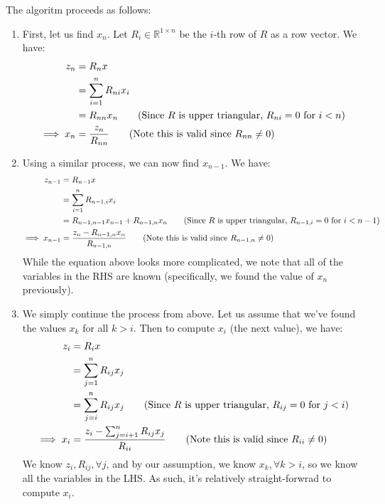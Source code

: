 \documentclass[12pt]{exam}
\begin{document}
\begin{questions}
\begin{solution}
    The algoritm proceeds as follows:
    \begin{enumerate}
      \item First, let us find $x_n$. Let $R_i \in \mathbb{R}^{1 \times n}$ be the $i$-th row of $R$ as a row vector. We have:
        \begin{align*}
          z_n &= R_n x \\
          &= \sum_{i=1}^n R_{ni} x_i \\
          &= R_{nn} x_n \tag{Since $R$ is upper triangular, $R_{ni} = 0$ for $i < n$} \\
          \implies x_n &= \frac{z_n}{R_{nn}} \tag{Note this is valid since $R_{nn} \neq 0$}
        \end{align*}
      \item Using a similar process, we can now find $x_{n-1}$. We have:
        \begin{align*}
          z_{n-1} &= R_{n-1} x \\
          &= \sum_{i=1}^n R_{n-1,i} x_i \\
          &= R_{n-1, n-1}x_{n-1} + R_{n-1,n} x_n \tag{Since $R$ is upper triangular, $R_{n-1,i} = 0$ for $i < n-1$} \\
          \implies x_{n-1} &= \frac{z_n - R_{n-1,n}x_n}{R_{n-1,n}} \tag{Note this is valid since $R_{n-1,n} \neq 0$}
        \end{align*}
        While the equation above looks more complicated, we note that all of the variables in the RHS are known (specifically, we found the value of $x_n$ previously).
      \item We simply continue the process from above. Let us assume that we've found the values $x_k$ for all $k > i$. Then to compute $x_i$ (the next value), we have:
        \begin{align*}
          z_i &= R_i x \\
          &= \sum_{j=1}^n R_{ij} x_j \\
          &= \sum_{j=i}^n R_{ij} x_j\tag{Since $R$ is upper triangular, $R_{ij} = 0$ for $j < i$} \\
          \implies x_i &= \frac{z_i - \sum_{j=i+1}^n R_{ij} x_j}{R_{ii}} \tag{Note this is valid since $R_{ii} \neq 0$}
        \end{align*}
        We know $z_i, R_{ij}, \forall j$, and by our assumption, we know $x_k, \forall k > i$, so we know all the variables in the LHS. As such, it's relatively straight-forwrad to compute $x_i$.
    \end{enumerate}


\end{solution}
\end{questions}
\end{document}
